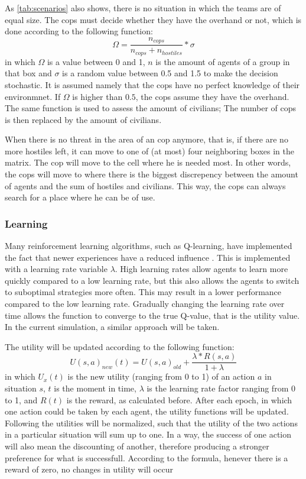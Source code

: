As \autoref{tab:scenarios} also shows, there is no situation in which the teams are of equal size. The cops must decide whether they have the overhand or not, which is done according to the following function:
$$ \Omega = \frac{n_{cops}}{n_{cops} + n_{hostiles}}*\sigma $$
in which $\Omega$ is a value between 0 and 1, $n$ is the amount of agents of a group in that box and $\sigma$ is a random value between 0.5 and 1.5 to make the decision stochastic. It is assumed namely that the cops have no perfect knowledge of their environmnet. If $\Omega$ is higher than $0.5$, the cops assume they have the overhand. The same function is used to assess the amount of civilians; The number of cops is then replaced by the amount of civilians. 

When there is no threat in the area of an cop anymore, that is, if there are no more hostiles left, it can move to one of (at most) four neighboring boxes in the matrix. The cop will move to the cell where he is needed most. In other words, the cops will move to where there is the biggest discrepency between the amount of agents and the sum of hostiles and civilians. This way, the cops can always search for a place where he can be of use. 

\subsubsection{Learning}
Many reinforcement learning algorithms, such as Q-learning, have implemented the fact that newer experiences have a reduced influence  \citep*{watkins1992q}. This is implemented with a learning rate variable $\lambda$. High learning rates allow agents to learn more quickly compared to a low learning rate, but this also allows the agents to switch to suboptimal strategies more often. This may result in a lower performance compared to the low learning rate. Gradually changing the learning rate over time allows the function to converge to the true Q-value, that is the utility value. In the current simulation, a similar approach will be taken. 

The utility will be updated according to the following function:
$$ U(s,a)_{new}(t) = U(s,a)_{old} + \frac{\lambda * R(s,a)}{1+\lambda} $$
in which $U_x(t)$ is the new utility (ranging from 0 to 1) of an action $a$ in situation $s$, $t$ is the moment in time, $\lambda$ is the learning rate factor ranging from 0 to 1, and $R(t)$ is the reward, as calculated before. After each epoch, in which one action could be taken by each agent, the utility functions will be updated. Following the utilities will be normalized, such that the utility of the two actions in a particular situation will sum up to one. In a way, the success of one action will also mean the discounting of another, therefore producing a stronger preference for what is successfull. According to the formula, henever there is a reward of zero, no changes in utility will occur

